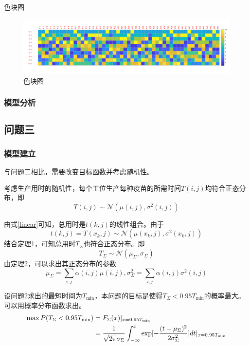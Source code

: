 \documentclass[UTF8]{ctexart}
\begin{document}
\begin{enumerate}
	色块图
		\begin{figure}[H]
			\centering %
			\includegraphics[scale=0.5]{2_sekuai.jpg}
			\caption{色块图}
		\end{figure}
	\end{enumerate}
	
	\subsubsection{模型分析}
	
	\subsection{问题三}
	\subsubsection{模型建立}
	与问题二相比，需要改变目标函数并考虑随机性。
	\par 考虑生产用时的随机性，每个工位生产每种疫苗的所需时间$T(i,j)$均符合正态分布，即
	\begin{equation}
	T(i,j)\sim\mathcal{N}(\mu(i,j),\sigma^2(i,j))
	\end{equation}
	\par 由式\ref{linear}可知，总用时是$t(k,j)$的线性组合。由于
	\begin{equation}
	t(k,j)=T(x_{k},j)\sim\mathcal{N}(\mu(x_{k},j),\sigma^2(x_{k},j))
	\end{equation}
	结合定理1，可知总用时$T_{\Sigma}$也符合正态分布。即
	\begin{equation}
	T_{\Sigma}\sim\mathcal{N}(\mu_{\Sigma},\sigma_{\Sigma})
	\end{equation}
	由定理2，可以求出其正态分布的参数
	\begin{equation}
		\mu_{\Sigma}=\sum_{i,j}\alpha(i,j)\mu(i,j),\sigma_{\Sigma}^{2}=\sum_{i,j}\alpha(i,j)\sigma^{2}(i,j)
		\label{all}
	\end{equation}
	\par 设问题2求出的最短时间为$T_{\min}$，本问题的目标是使得$T_{\Sigma}<0.95T_{\min}$的概率最大。可以用概率分布函数求出。
	\begin{equation}
        	\begin{split}
        	\max P(T_{\Sigma}<0.95T_{\min})&=F_{\Sigma}(x)|_{x=0.95T_{\min}}\\
			&=\frac{1}{\sqrt{2\pi}\sigma_{\Sigma}}\int^{x}_{-\infty}\exp[{-\frac{(t-\mu_{\Sigma})^2}{2\sigma_{\Sigma}^2}}]dt\arrowvert_{x=0.95T_{\min}}
        	\end{split}
		\label{pr}
	\end{equation}
\end{document}
